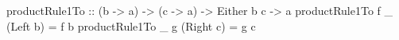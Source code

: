 \begin{code}
productRule1To
    :: (b -> a)
    -> (c -> a)
    -> Either b c
    -> a
productRule1To f _ (Left b)  = f b
productRule1To _ g (Right c) = g c
\end{code}
